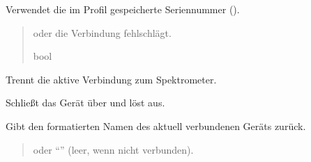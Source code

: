\documentclass[letterpaper,10pt,english]{sphinxmanual}
\begin{document}
\begin{fulllineitems}
\begin{fulllineitems}
\sphinxAtStartPar
Verwendet die im Profil gespeicherte Seriennummer ().
\begin{quote}\begin{description}
\sphinxAtStartPar
\begin{description}
\sphinxAtStartPar
oder die Verbindung fehlschlägt.

\end{description}


\sphinxAtStartPar
bool

\end{description}\end{quote}

\end{fulllineitems}


\begin{fulllineitems}
\label{\detokenize{modulab/spectrometer_manager:modules.spectrometer.SpectrometerManager.SpectrometerManager.disconnect}}
\pysigstartsignatures
\pysiglinewithargsret
{}
{}
{}
\pysigstopsignatures
\sphinxAtStartPar
Trennt die aktive Verbindung zum Spektrometer.

\sphinxAtStartPar
Schließt das Gerät über  und löst
 aus.

\end{fulllineitems}


\begin{fulllineitems}
\label{\detokenize{modulab/spectrometer_manager:modules.spectrometer.SpectrometerManager.SpectrometerManager.get_activeDeviceName}}
\pysigstartsignatures
\pysiglinewithargsret
{}
{}
{}
\pysigstopsignatures
\sphinxAtStartPar
Gibt den formatierten Namen des aktuell verbundenen Geräts zurück.
\begin{quote}\begin{description}
\sphinxAtStartPar
\begin{description}
\sphinxAtStartPar
oder “” (leer, wenn nicht verbunden).


\end{description}
\end{description}
\end{quote}
\end{fulllineitems}
\end{fulllineitems}
\end{document}

